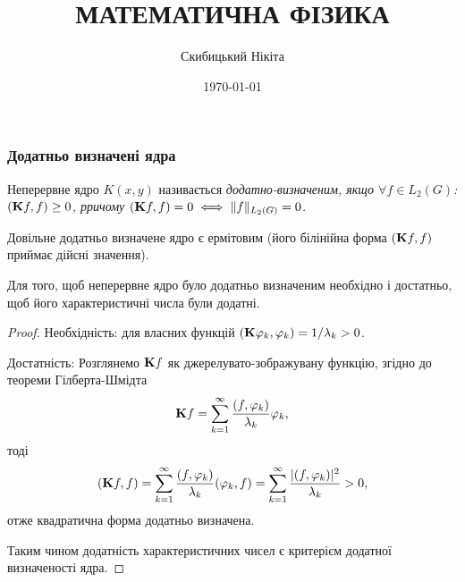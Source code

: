 

\title{{\Huge МАТЕМАТИЧНА ФІЗИКА}}
\author{Скибицький Нікіта}
\date{\today}





\tableofcontents

% 
% 
% 

\setcounter{section}{2}
\setcounter{subsection}{4}
\setcounter{subsubsection}{4}
\setcounter{theorem}{15}
\setcounter{equation}{41}

\subsubsection{Додатньо визначені ядра}

\begin{definition}
    Неперервне ядро $K(x, y)$ називається \it{додатно-визначеним}, якщо $\forall f \in L_2(G)$: $(\bf{K}f, f) \ge 0$, рричому $(\bf{K}f, f) = 0 \iff \|f\|_{L_2(G)} = 0$.
\end{definition}

\begin{remark}
    Довільне додатньо визначене ядро є ермітовим (його білінійна форма $(\bf{K}f, f)$ приймає дійсні значення).
\end{remark}

\begin{lemma}
    Для того, щоб неперервне ядро було додатньо визначеним необхідно і достатньо, щоб його характеристичні числа були додатні.
\end{lemma}

\begin{proof}
    Необхідність: для власних функцій $(\bf{K} \phi_k, \phi_k) = 1 / \lambda_k > 0$. \medskip

    Достатність: Розглянемо $\bf{K} f$ як джерелувато-зображувану функцію, згідно до теореми Гілберта-Шмідта
    \begin{equation}
        \bf{K} f = \sum_{k = 1}^\infty \frac{(f, \phi_k)}{\lambda_k} \phi_k,
    \end{equation}
    тоді 
    \begin{equation}
        (\bf{K}f, f) = \Sum_{k = 1}^\infty \dfrac{(f, \phi_k)}{\lambda_k} (\phi_k, f) = \Sum_{k = 1}^\infty \dfrac{|(f, \phi_k)|^2}{\lambda_k} > 0,
    \end{equation}
    отже квадратична форма додатньо визначена. \medskip

    Таким чином додатність характеристичних чисел є критерієм додатної визначеності ядра.
\end{proof}

